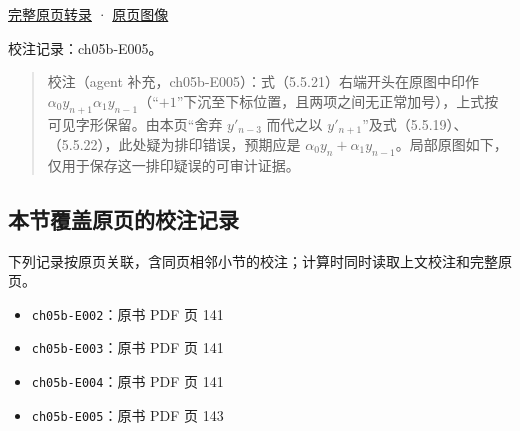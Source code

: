 \documentclass[
  10pt,
  fontset=fandol]{ctexart}
\providecommand{\tightlist}{%
  \setlength{\itemsep}{0pt}\setlength{\parskip}{0pt}}
\begin{document}
\href{../pages/pdf-143.md}{完整原页转录} · \href{../../source-images/pdf-143.jpeg}{原页图像}

校注记录：ch05b-E005。

\begin{quote}
校注（agent 补充，ch05b-E005）：式（5.5.21）右端开头在原图中印作 \(\alpha_0y_{n+1}\alpha_1y_{n-1}\)（``\(+1\)''下沉至下标位置，且两项之间无正常加号），上式按可见字形保留。由本页``舍弃 \(y'_{n-3}\) 而代之以 \(y'_{n+1}\)''及式（5.5.19）、（5.5.22），此处疑为排印错误，预期应是 \(\alpha_0y_n+\alpha_1y_{n-1}\)。局部原图如下，仅用于保存这一排印疑误的可审计证据。
\end{quote}

\subsection{本节覆盖原页的校注记录}\label{ux672cux8282ux8986ux76d6ux539fux9875ux7684ux6821ux6ce8ux8bb0ux5f55}

下列记录按原页关联，含同页相邻小节的校注；计算时同时读取上文校注和完整原页。

\begin{itemize}
\tightlist
\item
  \texttt{ch05b-E002}：原书 PDF 页 141
\item
  \texttt{ch05b-E003}：原书 PDF 页 141
\item
  \texttt{ch05b-E004}：原书 PDF 页 141
\item
  \texttt{ch05b-E005}：原书 PDF 页 143
\end{itemize}
\end{document}
